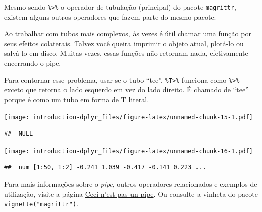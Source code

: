 \documentclass[]{book}
\newenvironment{Shaded}{\begin{snugshade}}{\end{snugshade}}
\newcommand{\DataTypeTok}[1]{\textcolor[rgb]{0.13,0.29,0.53}{#1}}
\newcommand{\DecValTok}[1]{\textcolor[rgb]{0.00,0.00,0.81}{#1}}
\newcommand{\KeywordTok}[1]{\textcolor[rgb]{0.13,0.29,0.53}{\textbf{#1}}}
\newcommand{\NormalTok}[1]{#1}
\newcommand{\OperatorTok}[1]{\textcolor[rgb]{0.81,0.36,0.00}{\textbf{#1}}}
\newcommand{\StringTok}[1]{\textcolor[rgb]{0.31,0.60,0.02}{#1}}
\begin{document}
Mesmo sendo \texttt{\%\textgreater{}\%} o operador de tubulação (principal) do pacote \texttt{magrittr}, existem alguns outros operadores que fazem parte do mesmo pacote:

Ao trabalhar com tubos mais complexos, às vezes é útil chamar uma função por seus efeitos colaterais. Talvez você queira imprimir o objeto atual, plotá-lo ou salvá-lo em disco. Muitas vezes, essas funções não retornam nada, efetivamente encerrando o pipe.

Para contornar esse problema, usar-se o tubo ``tee''. \texttt{\%T\textgreater{}\%} funciona como \texttt{\%\textgreater{}\%} exceto que retorna o lado esquerdo em vez do lado direito. É chamado de ``tee'' porque é como um tubo em forma de T literal.

\begin{Shaded}
\end{Shaded}

\texttt{[image: introduction-dplyr\_files/figure-latex/unnamed-chunk-15-1.pdf]}

\begin{verbatim}
##  NULL
\end{verbatim}

\begin{Shaded}
\end{Shaded}

\texttt{[image: introduction-dplyr\_files/figure-latex/unnamed-chunk-16-1.pdf]}

\begin{verbatim}
##  num [1:50, 1:2] -0.241 1.039 -0.417 -0.141 0.223 ...
\end{verbatim}

Para mais informações sobre o \emph{pipe}, outros operadores relacionados e exemplos de utilização, visite a página \href{https://cran.r-project.org/web/packages/magrittr/vignettes/magrittr.html}{Ceci n'est pas un pipe}. Ou consulte a vinheta do pacote \texttt{vignette("magrittr")}.
\end{document}
